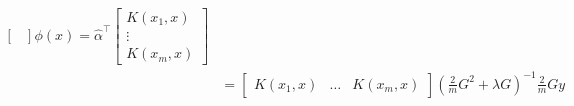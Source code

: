\documentclass{amsart}
\theoremstyle{definition}
\begin{document}
\begin{enumerate}[(a)]
\begin{align*}
\begin{bmatrix}
                                                 \end{bmatrix} \phi(x) = \hat{\alpha}^\intercal \begin{bmatrix}
                                                  K(x_1, x)\\
                                                  \vdots \\
                                                  K(x_m, x)
                                                 \end{bmatrix}\\
                                                 &=\begin{bmatrix}
                                                  K(x_1, x) & \ldots & K(x_m, x)
                                                 \end{bmatrix} \left(\frac2{m} G^2 + \lambda G\right)^{-1} \frac2{m} G y
      \end{align*}
\end{enumerate}
\end{document}
